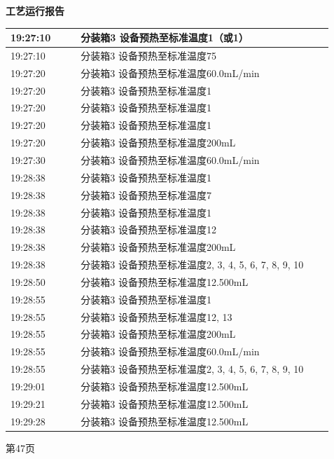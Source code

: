 \documentclass[UTF8,10pt,a4paper,fontset=fandol]{ctexart}
\begin{document}
\vspace{7mm}

\noindent
\begin{minipage}[t]{0.48\linewidth}
\centering
\textbf{工艺运行报告}

\vspace{2mm}
\scriptsize
\begin{tabular}{|p{0.20\linewidth}|p{0.72\linewidth}|}
\hline
19:27:10 & 分装箱3 设备预热至标准温度1（或1） \\ \hline
19:27:10 & 分装箱3 设备预热至标准温度75 \\ \hline
19:27:20 & 分装箱3 设备预热至标准温度60.0mL/min \\ \hline
19:27:20 & 分装箱3 设备预热至标准温度1 \\ \hline
19:27:20 & 分装箱3 设备预热至标准温度1 \\ \hline
19:27:20 & 分装箱3 设备预热至标准温度1 \\ \hline
19:27:20 & 分装箱3 设备预热至标准温度200mL \\ \hline
19:27:30 & 分装箱3 设备预热至标准温度60.0mL/min \\ \hline
19:28:38 & 分装箱3 设备预热至标准温度1 \\ \hline
19:28:38 & 分装箱3 设备预热至标准温度7 \\ \hline
19:28:38 & 分装箱3 设备预热至标准温度1 \\ \hline
19:28:38 & 分装箱3 设备预热至标准温度12 \\ \hline
19:28:38 & 分装箱3 设备预热至标准温度200mL \\ \hline
19:28:38 & 分装箱3 设备预热至标准温度2, 3, 4, 5, 6, 7, 8, 9, 10 \\ \hline
19:28:50 & 分装箱3 设备预热至标准温度12.500mL \\ \hline
19:28:55 & 分装箱3 设备预热至标准温度1 \\ \hline
19:28:55 & 分装箱3 设备预热至标准温度12, 13 \\ \hline
19:28:55 & 分装箱3 设备预热至标准温度200mL \\ \hline
19:28:55 & 分装箱3 设备预热至标准温度60.0mL/min \\ \hline
19:28:55 & 分装箱3 设备预热至标准温度2, 3, 4, 5, 6, 7, 8, 9, 10 \\ \hline
19:29:01 & 分装箱3 设备预热至标准温度12.500mL \\ \hline
19:29:21 & 分装箱3 设备预热至标准温度12.500mL \\ \hline
19:29:28 & 分装箱3 设备预热至标准温度12.500mL \\ \hline
\end{tabular}

\vspace{2mm}
第47页
\end{minipage}
\end{document}
